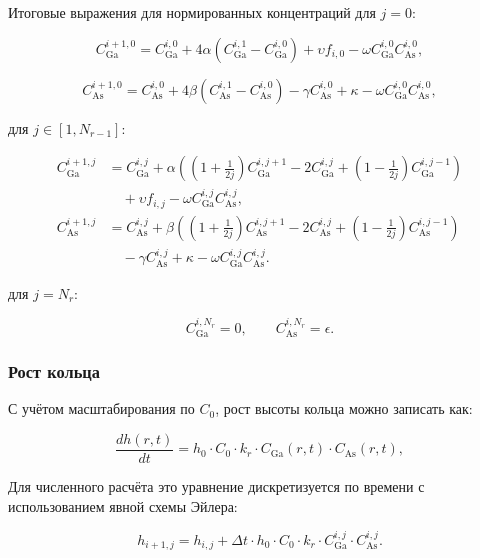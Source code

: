 \documentclass[14pt,oneside]{extarticle}
\begin{document}
Итоговые выражения для нормированных концентраций для $j=0$:

\[
C_{\text{Ga}}^{i+1,0} = C_{\text{Ga}}^{i,0}
+ 4 \alpha (C_{\text{Ga}}^{i,1} - C_{\text{Ga}}^{i,0})
+ \upsilon f_{i,0}
- \omega C_{\text{Ga}}^{i,0} C_{\text{As}}^{i,0},
\]

\[
C_{\text{As}}^{i+1,0} = C_{\text{As}}^{i,0}
+ 4 \beta (C_{\text{As}}^{i,1} - C_{\text{As}}^{i,0})
- \gamma C_{\text{As}}^{i,0}
+ \kappa
- \omega C_{\text{Ga}}^{i,0} C_{\text{As}}^{i,0},
\]

для $j\in\left[1,N_{r-1}\right]$:

\begin{align}
    C_{\text{Ga}}^{i+1,j} &= C_{\text{Ga}}^{i,j}
    + \alpha \left( \left(1+\frac{1}{2j}\right) C_{\text{Ga}}^{i,j+1}
    - 2 C_{\text{Ga}}^{i,j}
    + \left(1-\frac{1}{2j}\right) C_{\text{Ga}}^{i,j-1} \right) \nonumber \\
    &\quad + \upsilon f_{i,j}
    - \omega C_{\text{Ga}}^{i,j} C_{\text{As}}^{i,j}, \nonumber \\
    C_{\text{As}}^{i+1,j} &= C_{\text{As}}^{i,j}
    + \beta \left( \left(1+\frac{1}{2j}\right) C_{\text{As}}^{i,j+1}
    - 2 C_{\text{As}}^{i,j}
    + \left(1-\frac{1}{2j}\right) C_{\text{As}}^{i,j-1} \right) \nonumber \\
    &\quad - \gamma C_{\text{As}}^{i,j}
    + \kappa
    - \omega C_{\text{Ga}}^{i,j} C_{\text{As}}^{i,j}.
\end{align}    

для $j=N_{r}$:

\[
C_{\text{Ga}}^{i,N_r} = 0, \qquad C_{\text{As}}^{i,N_r} = \epsilon.
\]

\subsubsection{Рост кольца}

С учётом масштабирования по \( C_0 \), рост высоты кольца можно записать как:

\begin{equation}
\frac{d h(r,t)}{d t} = h_0 \cdot C_0 \cdot k_r \cdot C_{\text{Ga}}(r,t) \cdot C_{\text{As}}(r,t),
\end{equation}

Для численного расчёта это уравнение дискретизуется по времени с использованием явной схемы Эйлера:

\begin{equation}
h_{i+1,j} = h_{i,j} + \Delta t \cdot h_0 \cdot C_0 \cdot k_r \cdot C_{\text{Ga}}^{i,j} \cdot C_{\text{As}}^{i,j}.
\end{equation}
\end{document}
